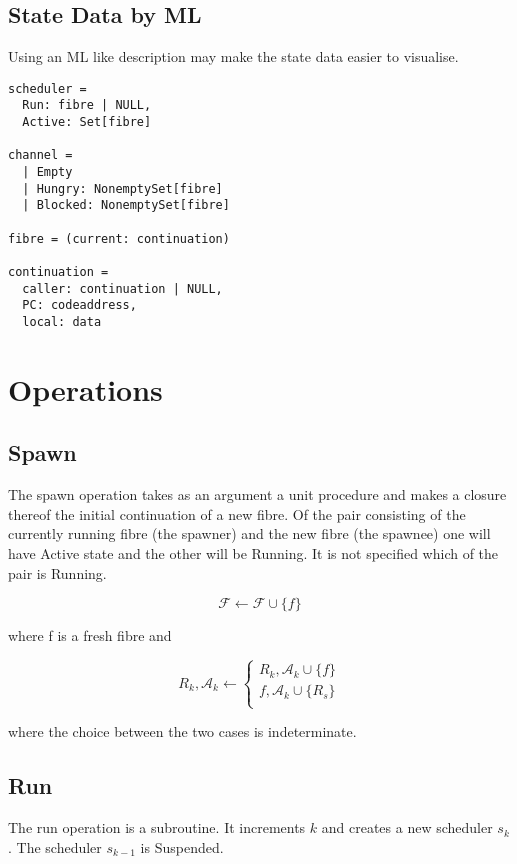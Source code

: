 \documentclass[oneside]{book}
\begin{document}
\subsection{State Data by ML}
Using an ML like description may make the state data easier
to visualise.

\begin{verbatim}
scheduler =
  Run: fibre | NULL, 
  Active: Set[fibre]

channel = 
  | Empty 
  | Hungry: NonemptySet[fibre]
  | Blocked: NonemptySet[fibre]

fibre = (current: continuation)

continuation = 
  caller: continuation | NULL,
  PC: codeaddress,
  local: data
\end{verbatim}

\section{Operations}

\subsection{Spawn} 
The spawn operation takes as an argument a unit procedure and makes
a closure thereof the initial continuation
of a new fibre.  Of the pair consisting of the currently running
fibre (the spawner) and the new fibre (the spawnee) one will have Active
state and the other will be Running. It is not specified which
of the pair is Running.

\begin{equation}
{\mathcal F} \leftarrow {\mathcal F} \cup \{f\}
\end{equation}

where f is a fresh fibre and

\begin{equation}
R_k,{\mathcal A_k} \leftarrow
\begin{cases}
R_k,{\mathcal A_k} \cup \{f\} \\
f,{\mathcal A_k} \cup \{R_s\} \\
\end{cases}
\end{equation}

where the choice between the two cases is indeterminate.

\subsection{Run} 
The run operation is a subroutine. It increments $k$ and creates
a new scheduler $s_k$. The scheduler $s_{k-1}$ is Suspended. 
\end{document}
